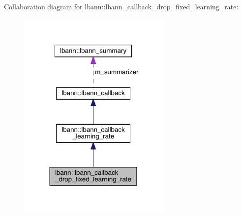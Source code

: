 Collaboration diagram for lbann\+:\+:lbann\+\_\+callback\+\_\+drop\+\_\+fixed\+\_\+learning\+\_\+rate\+:\nopagebreak
\begin{figure}[H]
\begin{center}
\leavevmode
\includegraphics[width=215pt]{classlbann_1_1lbann__callback__drop__fixed__learning__rate__coll__graph}
\end{center}
\end{figure}

